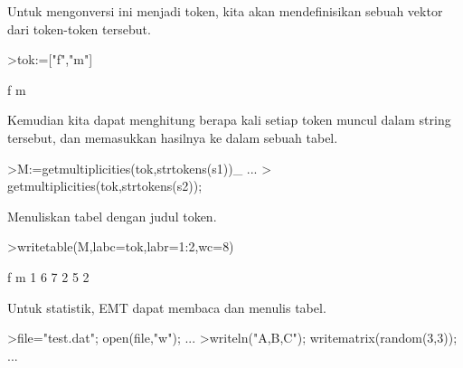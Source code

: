 \documentclass[12pt,arial,letterpaper]{book}
\begin{document}
\begin{eulercomment}
\begin{eulercomment}
\begin{eulercomment}
\begin{eulercomment}
\begin{eulercomment}
\begin{eulercomment}
\begin{eulercomment}
\begin{eulercomment}
\begin{eulercomment}
\begin{eulercomment}
\begin{eulercomment}
\begin{eulercomment}
\begin{eulercomment}
\begin{eulercomment}
\begin{eulercomment}
\begin{eulercomment}
\begin{eulercomment}
\begin{eulercomment}
\begin{eulercomment}
\begin{eulercomment}
\begin{eulercomment}
\begin{eulercomment}
\begin{eulercomment}
\begin{eulercomment}
\begin{eulercomment}
\begin{eulercomment}
\begin{eulercomment}
\begin{eulercomment}
\begin{eulercomment}
\begin{eulercomment}
\begin{eulercomment}
\begin{eulercomment}
\begin{eulercomment}
\begin{eulercomment}
\begin{eulercomment}
\begin{eulercomment}
\begin{eulercomment}
\begin{eulercomment}
\begin{eulerprompt}
\end{eulerprompt}
\begin{eulercomment}
Untuk mengonversi ini menjadi token, kita akan mendefinisikan sebuah
vektor dari token-token tersebut.
\end{eulercomment}
\begin{eulerprompt}
>tok:=["f","m"]
\end{eulerprompt}
\begin{euleroutput}
  f
  m
\end{euleroutput}
\begin{eulercomment}
Kemudian kita dapat menghitung berapa kali setiap token muncul dalam
string tersebut, dan memasukkan hasilnya ke dalam sebuah tabel.
\end{eulercomment}
\begin{eulerprompt}
>M:=getmultiplicities(tok,strtokens(s1))_ ...
>  getmultiplicities(tok,strtokens(s2));
\end{eulerprompt}
\begin{eulercomment}
Menuliskan tabel dengan judul token.
\end{eulercomment}
\begin{eulerprompt}
>writetable(M,labc=tok,labr=1:2,wc=8)
\end{eulerprompt}
\begin{euleroutput}
                 f       m
         1       6       7
         2       5       2
\end{euleroutput}
\begin{eulercomment}
Untuk statistik, EMT dapat membaca dan menulis tabel.
\end{eulercomment}
\begin{eulerprompt}
>file="test.dat"; open(file,"w"); ...
>writeln("A,B,C"); writematrix(random(3,3)); ...

\end{eulerprompt}
\end{eulercomment}
\end{eulercomment}
\end{eulercomment}
\end{eulercomment}
\end{eulercomment}
\end{eulercomment}
\end{eulercomment}
\end{eulercomment}
\end{eulercomment}
\end{eulercomment}
\end{eulercomment}
\end{eulercomment}
\end{eulercomment}
\end{eulercomment}
\end{eulercomment}
\end{eulercomment}
\end{eulercomment}
\end{eulercomment}
\end{eulercomment}
\end{eulercomment}
\end{eulercomment}
\end{eulercomment}
\end{eulercomment}
\end{eulercomment}
\end{eulercomment}
\end{eulercomment}
\end{eulercomment}
\end{eulercomment}
\end{eulercomment}
\end{eulercomment}
\end{eulercomment}
\end{eulercomment}
\end{eulercomment}
\end{eulercomment}
\end{eulercomment}
\end{eulercomment}
\end{eulercomment}
\end{eulercomment}
\end{document}
